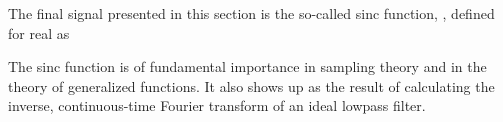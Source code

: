 \documentclass{article}
\begin{document}
\begin{CellGroup}
\begin{CellGroup}
\end{CellGroup}
\begin{CellGroup}
The final signal presented in this section is the so-called sinc function, , defined for real 
as



The sinc function is of fundamental importance in sampling theory and in the theory of generalized functions. It also shows up as the result of calculating
the inverse, continuous-time Fourier transform of an ideal lowpass filter.

\begin{CellGroup}

\end{CellGroup}
\begin{CellGroup}



\end{CellGroup}

\end{CellGroup}

\end{CellGroup}
\end{document}
